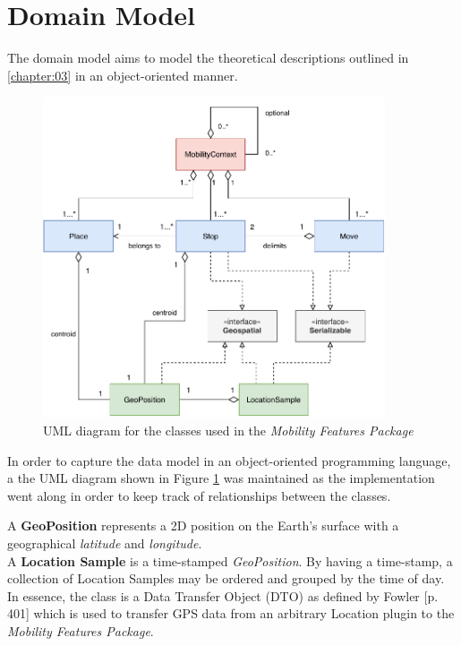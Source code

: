 \section{Domain Model}
The domain model aims to model the theoretical descriptions outlined in \ref{chapter:03} in an object-oriented manner.

\begin{figure}[h]
    \centering
    \includegraphics[width=0.9\textwidth]{images/diagrams/data-model-diagram.pdf}
    \caption{UML diagram for the classes used in the \textit{Mobility Features Package}}
    \label{fig:uml-diagram}
\end{figure}

In order to capture the data model in an object-oriented programming language, a the UML diagram shown in Figure \ref{fig:uml-diagram} was maintained as the implementation went along in order to keep track of relationships between the classes. 

A \textbf{GeoPosition} represents a 2D position on the Earth's surface with a geographical \textit{latitude} and \textit{longitude}.\\

A \textbf{Location Sample} is a time-stamped \textit{GeoPosition}. By having a time-stamp, a collection of Location Samples may be ordered and grouped by the time of day. In essence, the class is a Data Transfer Object (DTO) as defined by Fowler \cite{fowler-PEEA} [p. 401] which is used to transfer GPS data from an arbitrary Location plugin to the \textit{Mobility Features Package}.\\

